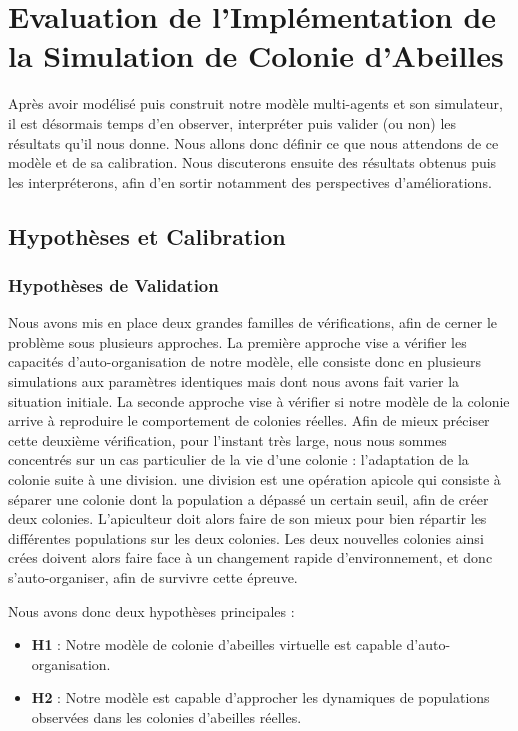 \chapter{Evaluation de l'Implémentation de la Simulation de Colonie d'Abeilles}
\label{ChapitreEvalSMA}
	Après avoir modélisé puis construit notre modèle multi-agents et son simulateur, il est désormais temps d'en observer, interpréter puis valider (ou non) les résultats qu'il nous donne. Nous allons donc définir ce que nous attendons de ce modèle et de sa calibration. Nous discuterons ensuite des résultats obtenus puis les interpréterons, afin d'en sortir notamment des perspectives d'améliorations.
	
	\section{Hypothèses et Calibration}
		\subsection{Hypothèses de Validation}
			Nous avons mis en place deux grandes familles de vérifications, afin de cerner le problème sous plusieurs approches. La première approche vise a vérifier les capacités d'auto-organisation de notre modèle, elle consiste donc en plusieurs simulations aux paramètres identiques mais dont nous avons fait varier la situation initiale. La seconde approche vise à vérifier si notre modèle de la colonie arrive à reproduire le comportement de colonies réelles. Afin de mieux préciser cette deuxième vérification, pour l'instant très large, nous nous sommes concentrés sur un cas particulier de la vie d'une colonie : l'adaptation de la colonie suite à une division. une division est une opération apicole qui consiste à séparer une colonie dont la population a dépassé un certain seuil, afin de créer deux colonies. L'apiculteur doit alors faire de son mieux pour bien répartir les différentes populations sur les deux colonies. Les deux nouvelles colonies ainsi crées doivent alors faire face à un changement rapide d'environnement, et donc s'auto-organiser, afin de survivre cette épreuve.
			
			Nous avons donc deux hypothèses principales :
			\begin{itemize}
				\item \textbf{H1} : Notre modèle de colonie d'abeilles virtuelle est capable d'auto-organisation.
				\item \textbf{H2} : Notre modèle est capable d'approcher les dynamiques de populations observées dans les colonies d'abeilles réelles.
			\end{itemize}
			

